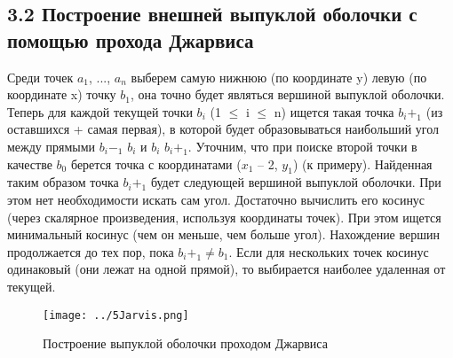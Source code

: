 \documentclass{report}
\begin{document}
\subsection*{3.2 Построение внешней выпуклой оболочки с помощью прохода Джарвиса}
\par Среди точек  $a_1$, ...,  $a_n$ выберем самую нижнюю (по координате y) левую (по координате x) точку $b_1$, она точно будет являться вершиной выпуклой оболочки. Теперь для каждой текущей точки $b_i$ (1 $\leq$ i $\leq$ n) ищется такая точка $b_i+_1$ (из оставшихся + самая первая), в которой будет образовываться наибольший угол между прямыми $b_i-_1$ $b_i$ и $b_i$ $b_i+_1$. Уточним, что при поиске второй точки в качестве $b_0$ берется точка с координатами ($x_1$ – 2, $y_1$) (к примеру). Найденная таким образом точка $b_i+_1$ будет следующей вершиной выпуклой оболочки. При этом нет необходимости искать сам угол. Достаточно вычислить его косинус (через скалярное произведения, используя координаты точек). При этом ищется минимальный косинус (чем он меньше, чем больше угол). Нахождение вершин продолжается до тех пор, пока $b_i+_1 \neq b_1$. Если для нескольких точек косинус одинаковый (они лежат на одной прямой), то выбирается наиболее удаленная от текущей. 
\begin{figure}[htbp]
  \centering
  \texttt{[image: ../5Jarvis.png]}
  \caption{Построение выпуклой оболочки проходом Джарвиса}\label{fig:../5Jarvis.png}
\end{figure}
\end{document}
